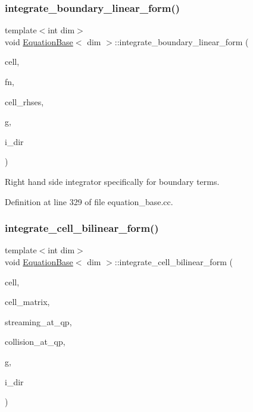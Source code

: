 \subsubsection{\texorpdfstring{integrate\+\_\+boundary\+\_\+linear\+\_\+form()}{integrate\_boundary\_linear\_form()}}
{\footnotesize\ttfamily template$<$int dim$>$ \\
void \hyperlink{class_equation_base}{Equation\+Base}$<$ dim $>$\+::integrate\+\_\+boundary\+\_\+linear\+\_\+form (\begin{DoxyParamCaption}\item[{typename Do\+F\+Handler$<$ dim $>$\+::active\+\_\+cell\+\_\+iterator \&}]{cell,  }\item[{unsigned int \&}]{fn,  }\item[{Vector$<$ double $>$ \&}]{cell\+\_\+rhses,  }\item[{const unsigned int \&}]{g,  }\item[{const unsigned int \&}]{i\+\_\+dir }\end{DoxyParamCaption})\hspace{0.3cm}{\ttfamily [virtual]}}



Right hand side integrator specifically for boundary terms. 



Definition at line 329 of file equation\+\_\+base.\+cc.

\mbox{\label{class_equation_base_a7421b3c18433975ac794ac22c3af715a}} 
\subsubsection{\texorpdfstring{integrate\+\_\+cell\+\_\+bilinear\+\_\+form()}{integrate\_cell\_bilinear\_form()}}
{\footnotesize\ttfamily template$<$int dim$>$ \\
void \hyperlink{class_equation_base}{Equation\+Base}$<$ dim $>$\+::integrate\+\_\+cell\+\_\+bilinear\+\_\+form (\begin{DoxyParamCaption}\item[{typename Do\+F\+Handler$<$ dim $>$\+::active\+\_\+cell\+\_\+iterator \&}]{cell,  }\item[{Full\+Matrix$<$ double $>$ \&}]{cell\+\_\+matrix,  }\item[{std\+::vector$<$ std\+::vector$<$ Full\+Matrix$<$ double $>$ $>$ $>$ \&}]{streaming\+\_\+at\+\_\+qp,  }\item[{std\+::vector$<$ Full\+Matrix$<$ double $>$ $>$ \&}]{collision\+\_\+at\+\_\+qp,  }\item[{const unsigned int \&}]{g,  }\item[{const unsigned int \&}]{i\+\_\+dir }\end{DoxyParamCaption})\hspace{0.3cm}{\ttfamily [virtual]}}



